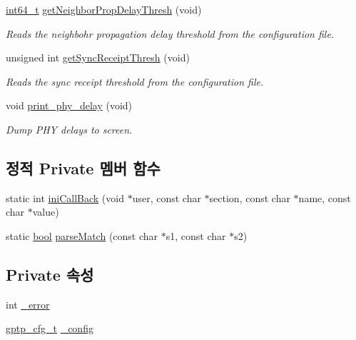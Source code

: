 \begin{DoxyCompactItemize}
\hyperlink{parse_8c_a67a9885ef4908cb72ce26d75b694386c}{int64\+\_\+t} \hyperlink{class_gptp_ini_parser_a54db0c6cf2c421ea9dd18364ebf69e1d}{get\+Neighbor\+Prop\+Delay\+Thresh} (void)
\begin{DoxyCompactList}\small\item\em Reads the neighbohr propagation delay threshold from the configuration file. \end{DoxyCompactList}\item 
unsigned int \hyperlink{class_gptp_ini_parser_a1d21b1d5b5ee2cd801e1a14a0b311ce4}{get\+Sync\+Receipt\+Thresh} (void)
\begin{DoxyCompactList}\small\item\em Reads the sync receipt threshold from the configuration file. \end{DoxyCompactList}\item 
void \hyperlink{class_gptp_ini_parser_ae8f7d18c76a73ce35ae58fe57852fe8d}{print\+\_\+phy\+\_\+delay} (void)
\begin{DoxyCompactList}\small\item\em Dump P\+HY delays to screen. \end{DoxyCompactList}\end{DoxyCompactItemize}
\subsection*{정적 Private 멤버 함수}
\begin{DoxyCompactItemize}
\item 
static int \hyperlink{class_gptp_ini_parser_a13494bbd725f144dc32c2565fdfdbad5}{ini\+Call\+Back} (void $\ast$user, const char $\ast$section, const char $\ast$name, const char $\ast$value)
\item 
static \hyperlink{avb__gptp_8h_af6a258d8f3ee5206d682d799316314b1}{bool} \hyperlink{class_gptp_ini_parser_a8465186d2562a5e0c599175104b214ad}{parse\+Match} (const char $\ast$s1, const char $\ast$s2)
\end{DoxyCompactItemize}
\subsection*{Private 속성}
\begin{DoxyCompactItemize}
\item 
int \hyperlink{class_gptp_ini_parser_ac8276d19a3649d089bb13cdc726cf3cc}{\+\_\+error}
\item 
\hyperlink{struct_gptp_ini_parser_1_1gptp__cfg__t}{gptp\+\_\+cfg\+\_\+t} \hyperlink{class_gptp_ini_parser_a8733e97ddaee116e34a67d3e222e45c9}{\+\_\+config}
\end{DoxyCompactItemize}


